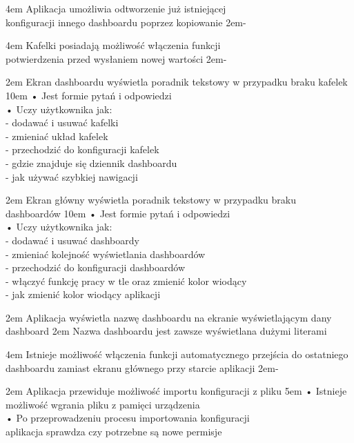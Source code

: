 {4em}{
    Aplikacja umożliwia odtworzenie już istniejącej\\
    konfiguracji innego dashboardu poprzez kopiowanie
}
{2em}{-}

{4em}{
    Kafelki posiadają możliwość włączenia funkcji\\
    potwierdzenia przed wysłaniem nowej wartości
}
{2em}{-}

{2em}{
    Ekran dashboardu wyświetla poradnik tekstowy w przypadku braku kafelek
}
{10em}{
    • Jest formie pytań i odpowiedzi\\
    • Uczy użytkownika jak:\\
    - dodawać i usuwać kafelki\\
    - zmieniać układ kafelek\\
    - przechodzić do konfiguracji kafelek\\
    - gdzie znajduje się dziennik dashboardu\\
    - jak używać szybkiej nawigacji
}

{2em}{
    Ekran główny wyświetla poradnik tekstowy w przypadku braku dashboardów
}
{10em}{
    • Jest formie pytań i odpowiedzi\\
    • Uczy użytkownika jak:\\
    - dodawać i usuwać dashboardy\\
    - zmieniać kolejność wyświetlania dashboardów\\
    - przechodzić do konfiguracji dashboardów\\
    - włączyć funkcję pracy w tle oraz zmienić kolor wiodący\\
    - jak zmienić kolor wiodący aplikacji
}

{2em}{
    Aplikacja wyświetla nazwę dashboardu na ekranie wyświetlającym dany dashboard
}
{2em}{
    Nazwa dashboardu jest zawsze wyświetlana dużymi literami
}

{4em}{
    Istnieje możliwość włączenia funkcji automatycznego przejścia do ostatniego\\
    dashboardu zamiast ekranu głównego przy starcie aplikacji
}
{2em}{-}

{2em}{
    Aplikacja przewiduje możliwość importu konfiguracji z pliku
}
{5em}{
    • Istnieje możliwość wgrania pliku z pamięci urządzenia\\
    • Po przeprowadzeniu procesu importowania konfiguracji\\
    \hspace*{0.5em} aplikacja sprawdza czy potrzebne są nowe permisje
}

